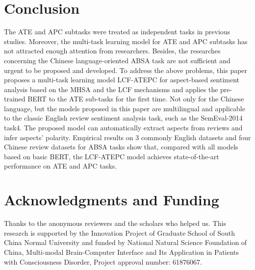 \documentclass[a4paper,fleqn]{cas-sc}
\begin{document}
\section{Conclusion}
\label{sect:Conclusion}

The ATE and APC subtasks were treated as independent tasks in previous studies. Moreover, the multi-task learning model for ATE and APC subtasks has not attracted enough attention from researchers. Besides, the researches concerning the Chinese language-oriented ABSA task are not sufficient and urgent to be proposed and developed. 
To address the above problems, this paper proposes a multi-task learning model LCF-ATEPC for aspect-based sentiment analysis based on the MHSA and the LCF mechanisms and applies the pre-trained BERT to the ATE sub-tasks for the first time. 
Not only for the Chinese language, but the models proposed in this paper are multilingual and applicable to the classic English review sentiment analysis task, such as the SemEval-2014 task4.
The proposed model can automatically extract aspects from reviews and infer aspects' polarity. Empirical results on 3 commonly English datasets and four Chinese review datasets for ABSA tasks show that, compared with all models based on basic BERT, the LCF-ATEPC model achieves state-of-the-art performance on ATE and APC tasks.




\section*{Acknowledgments and Funding}
Thanks to the anonymous reviewers and the scholars who helped us. 
This research is supported by the Innovation Project of Graduate School of South China Normal University and funded by National Natural Science Foundation of China, Multi-modal Brain-Computer Interface and Its Application in Patients with Consciousness Disorder, Project approval number: 61876067. 



\end{document}
